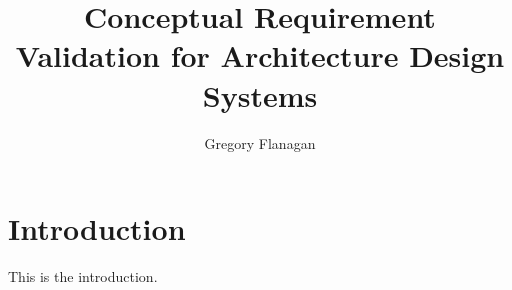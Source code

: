 \documentclass[12pt]{ucthesis}
\begin{document}

\title{Conceptual Requirement Validation for Architecture Design Systems}
\author{Gregory Flanagan}
  
 
     



\maketitle

\begin{frontmatter}

\copyrightpage

\committeemembershippage

\begin{abstract}
 



\end{abstract}





\tableofcontents


\listoftables

\listoffigures

\end{frontmatter}

\pagestyle{plain}




\renewcommand{\baselinestretch}{1.66}







\chapter{Introduction}
\label{intro}


This is the introduction.
\end{document}

